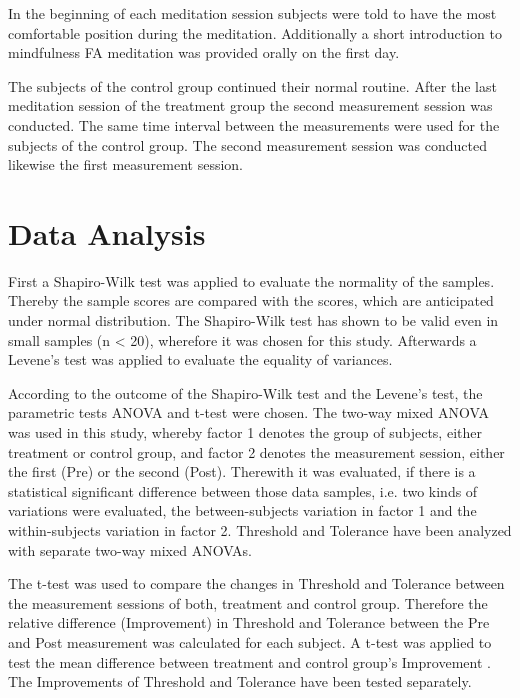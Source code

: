 In the beginning of each meditation session subjects were told to have the most comfortable position during the meditation.  Additionally a short introduction to mindfulness FA meditation was provided orally on the first day. 

The subjects of the control group continued their normal routine.
After the last meditation session of the treatment group the second measurement session was conducted. The same time interval between the measurements were used for the subjects of the control group. The second measurement session was conducted likewise the first measurement session.


\section{Data Analysis}
First a Shapiro-Wilk test was applied to evaluate the normality of the samples. Thereby the sample scores are compared with the scores, which are anticipated under normal distribution. The Shapiro-Wilk test has shown to be valid even in small samples (n < 20), wherefore it was chosen for this study. \cite{Shapiro1965,Mooi2018} Afterwards a Levene’s test was applied to evaluate the equality of variances.

According to the outcome of the Shapiro-Wilk test and the Levene’s test, the parametric tests ANOVA and t-test were chosen.
The two-way mixed ANOVA was used in this study, whereby factor 1 denotes the group of subjects, either treatment or control group, and factor 2 denotes the measurement session, either the first (Pre) or the second (Post). Therewith it was evaluated, if there is a statistical significant difference between those data samples, i.e. 
two kinds of variations were evaluated, the between-subjects variation in factor 1 and the within-subjects variation in factor 2. 
Threshold and Tolerance have been analyzed with separate two-way mixed ANOVAs. \cite{Mooi2018}

The t-test was used to compare the changes in Threshold and Tolerance between the measurement sessions of both, treatment and control group. Therefore the relative difference (Improvement) in Threshold and Tolerance between the Pre and Post measurement was calculated for each subject. A t-test was applied to test the mean difference between treatment and control group’s Improvement \cite{Mooi2018}. The Improvements of Threshold and Tolerance have been tested separately. 


